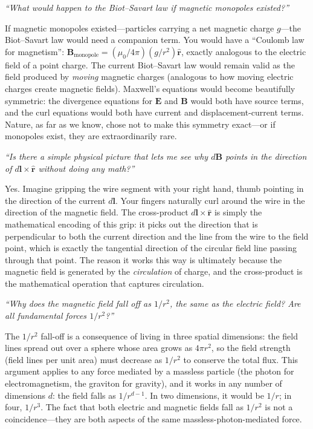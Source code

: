\documentclass[11pt,openright]{book}
\begin{document}
\textit{``What would happen to the Biot--Savart law if magnetic monopoles existed?''}

If magnetic monopoles existed---particles carrying a net magnetic charge $g$---the Biot--Savart law would need a companion term. You would have a ``Coulomb law for magnetism'': $\mathbf{B}_{\text{monopole}} = (\mu_0/4\pi)(g/r^2)\hat{\mathbf{r}}$, exactly analogous to the electric field of a point charge. The current Biot--Savart law would remain valid as the field produced by \emph{moving} magnetic charges (analogous to how moving electric charges create magnetic fields). Maxwell's equations would become beautifully symmetric: the divergence equations for $\mathbf{E}$ and $\mathbf{B}$ would both have source terms, and the curl equations would both have current and displacement-current terms. Nature, as far as we know, chose not to make this symmetry exact---or if monopoles exist, they are extraordinarily rare.

\textit{``Is there a simple physical picture that lets me see why $d\mathbf{B}$ points in the direction of $d\mathbf{l}\times\hat{\mathbf{r}}$ without doing any math?''}

Yes. Imagine gripping the wire segment with your right hand, thumb pointing in the direction of the current $d\mathbf{l}$. Your fingers naturally curl around the wire in the direction of the magnetic field. The cross-product $d\mathbf{l}\times\hat{\mathbf{r}}$ is simply the mathematical encoding of this grip: it picks out the direction that is perpendicular to both the current direction and the line from the wire to the field point, which is exactly the tangential direction of the circular field line passing through that point. The reason it works this way is ultimately because the magnetic field is generated by the \emph{circulation} of charge, and the cross-product is the mathematical operation that captures circulation.

\textit{``Why does the magnetic field fall off as $1/r^2$, the same as the electric field? Are all fundamental forces $1/r^2$?''}

The $1/r^2$ fall-off is a consequence of living in three spatial dimensions: the field lines spread out over a sphere whose area grows as $4\pi r^2$, so the field strength (field lines per unit area) must decrease as $1/r^2$ to conserve the total flux. This argument applies to any force mediated by a massless particle (the photon for electromagnetism, the graviton for gravity), and it works in any number of dimensions $d$: the field falls as $1/r^{d-1}$. In two dimensions, it would be $1/r$; in four, $1/r^3$. The fact that both electric and magnetic fields fall as $1/r^2$ is not a coincidence---they are both aspects of the same massless-photon-mediated force.
\end{document}
